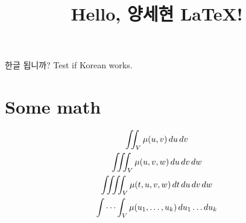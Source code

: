 \documentclass[12pt]{article}
\begin{document}
\title{Hello, 양세현 \LaTeX!}
\maketitle

한글 됩니까? Test if Korean works.

\section{Some math}
\begin{gather*}
    \iint_V \mu(u,v) \,du\,dv
\\
    \iiint_V \mu(u,v,w) \,du\,dv\,dw
\\
    \iiiint_V \mu(t,u,v,w) \,dt\,du\,dv\,dw
\\
    \idotsint_V \mu(u_1,\dots,u_k) \,du_1 \dots du_k
\end{gather*}
\end{document}
